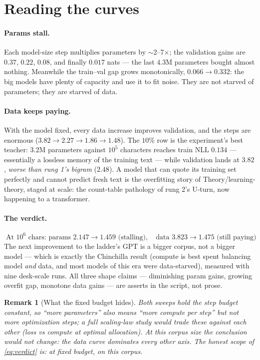 \documentclass[11pt]{article}
\newtheorem{remark}{Remark}
\begin{document}
\section{Reading the curves}

\paragraph{Params stall.} Each model-size step multiplies parameters
by $\sim$2--7$\times$; the validation gains are $0.37$, $0.22$,
$0.08$, and finally $0.017$ nats --- the last $4.3$M parameters
bought almost nothing. Meanwhile the train--val gap grows
monotonically, $0.066 \to 0.332$: the big models have plenty of
capacity and use it to fit noise. They are not starved of parameters;
they are starved of data.

\paragraph{Data keeps paying.} With the model fixed, every data
increase improves validation, and the steps are enormous
($3.82 \to 2.27 \to 1.86 \to 1.48$). The $10\%$ row is the
experiment's best teacher: $3.2$M parameters against $10^5$
characters reaches train NLL $0.134$ --- essentially a lossless
memory of the training text --- while validation lands at $3.82$,
\emph{worse than rung 1's bigram} ($2.48$). A model that can quote
its training set perfectly and cannot predict fresh text is the
overfitting story of Theory/learning-theory, staged at scale: the
count-table pathology of rung 2's U-turn, now happening to a
transformer.

\paragraph{The verdict.}
\begin{equation}
  \boxed{\;\text{At } 10^6 \text{ chars: params } 2.147 \to 1.459
  \text{ (stalling)}, \quad \text{data } 3.823 \to 1.475
  \text{ (still paying)}\;}
  \label{eq:verdict}
\end{equation}
The next improvement to the ladder's GPT is a bigger corpus, not a
bigger model --- which is exactly the Chinchilla result (compute is
best spent balancing model \emph{and} data, and most models of this
era were data-starved), measured with nine desk-scale runs. All three
shape claims --- diminishing param gains, growing overfit gap,
monotone data gains --- are asserts in the script, not prose.

\begin{remark}[What the fixed budget hides]
Both sweeps hold the step budget constant, so ``more parameters''
also means ``more compute per step'' but \emph{not} more optimization
steps; a full scaling-law study would trade these against each other
(loss vs compute at optimal allocation). At this corpus size the
conclusion would not change: the data curve dominates every other
axis. The honest scope of \eqref{eq:verdict} is: at fixed budget, on
this corpus.
\end{remark}
\end{document}
